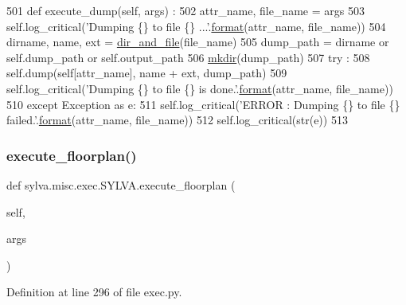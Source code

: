 \begin{DoxyCode}
501   \textcolor{keyword}{def }execute\_dump(self, args) :
502     attr\_name, file\_name = args
503     self.log\_critical(\textcolor{stringliteral}{'Dumping \{\} to file \{\} ...'}.\hyperlink{namespacesylva_1_1examples_1_1hsdfg_ab3510a0b8457362330aa4d9fd2209590}{format}(attr\_name, file\_name))
504     dirname, name, ext = \hyperlink{namespacesylva_1_1misc_1_1util_a0ce6d1d719234031353b60ac60f2af0d}{dir\_and\_file}(file\_name)
505     dump\_path = dirname \textcolor{keywordflow}{or} self.dump\_path \textcolor{keywordflow}{or} self.output\_path
506     \hyperlink{namespacesylva_1_1misc_1_1util_af426e429c40209bbb46e3a0e8f139a44}{mkdir}(dump\_path)
507     \textcolor{keywordflow}{try} :
508       self.dump(self[attr\_name], name + ext, dump\_path)
509       self.log\_critical(\textcolor{stringliteral}{'Dumping \{\} to file \{\} is done.'}.\hyperlink{namespacesylva_1_1examples_1_1hsdfg_ab3510a0b8457362330aa4d9fd2209590}{format}(attr\_name, file\_name))
510     \textcolor{keywordflow}{except} Exception \textcolor{keyword}{as} e:
511       self.log\_critical(\textcolor{stringliteral}{'ERROR : Dumping \{\} to file \{\} failed.'}.\hyperlink{namespacesylva_1_1examples_1_1hsdfg_ab3510a0b8457362330aa4d9fd2209590}{format}(attr\_name, file\_name))
512       self.log\_critical(str(e))
513 
\end{DoxyCode}
\mbox{\label{classsylva_1_1misc_1_1exec_1_1_s_y_l_v_a_ad398d309b523adda00dcb7929c568e65}} 
\subsubsection{\texorpdfstring{execute\+\_\+floorplan()}{execute\_floorplan()}}
{\footnotesize\ttfamily def sylva.\+misc.\+exec.\+S\+Y\+L\+V\+A.\+execute\+\_\+floorplan (\begin{DoxyParamCaption}\item[{}]{self,  }\item[{}]{args }\end{DoxyParamCaption})}



Definition at line 296 of file exec.\+py.



